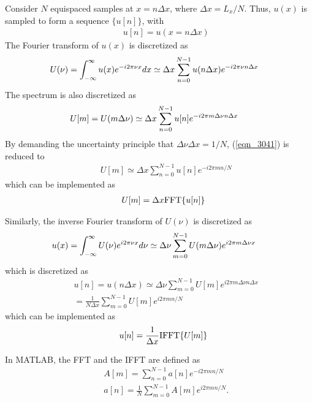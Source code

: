 Consider $N$ equispaced samples at $x = n \Delta x$, where $\Delta x = L_x / N$.
Thus, $u (x)$ is sampled to form a sequence $\{ u[n] \}$, with
\begin{eqnarray}
	&&u [n] = u (x = n \Delta x)
	\nonumber
\end{eqnarray}
The Fourier transform of $u(x)$ is discretized as
\begin{eqnarray}
	&&\hspace{-0.3in} U (\nu) = \int_{-\infty}^{\infty} u (x) e^{- i 2 \pi \nu x} dx
	\simeq \Delta x \sum_{n = 0}^{N - 1} u (n \Delta x) e^{- i 2 \pi \nu n \Delta x}
	\nonumber
\end{eqnarray}
The spectrum is also discretized as
\begin{eqnarray}
	&&\hspace{-0.3in} U[m] = U (m \Delta \nu) \simeq \Delta x \sum_{n = 0}^{N - 1} u [n] e^{- i 2 \pi m \Delta \nu n \Delta x}
	\label{eqn_3041}
\end{eqnarray}
By demanding the uncertainty principle that $\Delta \nu \Delta x =  1/N$,
(\ref{eqn_3041}) is reduced to
\begin{eqnarray}
	&&U[m] \simeq \Delta x \sum_{n = 0}^{N - 1} u [n] e^{- i 2 \pi m n / N}
	\label{eqn_3042}
\end{eqnarray}
which can be implemented as
\begin{eqnarray}
	&&U[m] = \Delta x {\rm FFT} \{ u [n] \}
	\label{eqn_3042a}
\end{eqnarray}

Similarly, the inverse Fourier transform of $U (\nu)$ is discretized as
\begin{eqnarray}
	&&\hspace{-0.3in} u(x) = \int_{-\infty}^{\infty} U (\nu) e^{i 2 \pi \nu x} d \nu
	\simeq \Delta \nu \sum_{m = 0}^{N - 1} U (m \Delta \nu) e^{i 2 \pi m \Delta \nu x}
	\nonumber
\end{eqnarray}
which is discretized as
\begin{eqnarray}
	&&u[n] = u(n \Delta x) 
	\simeq \Delta \nu \sum_{m = 0}^{N - 1} U [m] e^{i 2 \pi m \Delta \nu n \Delta x} 
	\nonumber \\
	&&= \frac{1}{N \Delta x} \sum_{m = 0}^{N - 1} U [m] e^{i 2 \pi m n /N} 
	\label{eqn_3043}
\end{eqnarray}
which can be implemented as
\begin{eqnarray}
	&&u[n] = \frac{1}{\Delta x} {\rm IFFT} \{ U [m] \}
	\label{eqn_3043a}
\end{eqnarray}

In MATLAB, the FFT and the IFFT are defined as
\begin{eqnarray}
	&&A[m] = \sum_{n = 0}^{N - 1} a[n] e^{-i 2\pi m n/ N}
	\nonumber \\
	&&a[n] = \frac{1}{N} \sum_{m = 0}^{N - 1} A[m] e^{i 2 \pi mn/N}.
	\label{eq:DFT_pairs}
\end{eqnarray}

